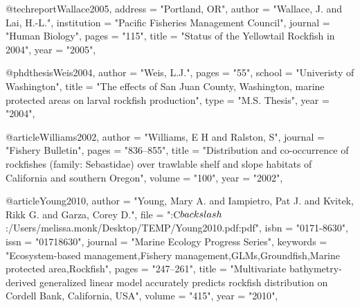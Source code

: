 @techreport{Wallace2005,
    address = "{Portland, OR}",
    author = "{Wallace, J. and Lai, H.-L.}",
    institution = "{Pacific Fisheries Management Council}",
    journal = "{Human Biology}",
    pages = "{115}",
    title = "{{Status of the Yellowtail Rockfish in 2004}}",
    year = "{2005}",
}

@phdthesis{Weis2004,
    author = "{Weis, L.J.}",
    pages = "{55}",
    school = "{Univeristy of Washington}",
    title = "{{The effects of San Juan County, Washington, marine protected areas on larval rockfish production}}",
    type = "{M.S. Thesis}",
    year = "{2004}",
}

@article{Williams2002,
    author = "{Williams, E H and Ralston, S}",
    journal = "{Fishery Bulletin}",
    pages = "{836--855}",
    title = "{{Distribution and co-occurrence of rockfishes (family: Sebastidae) over trawlable shelf and slope habitats of California and southern Oregon}}",
    volume = "{100}",
    year = "{2002}",
}

@article{Young2010,
    author = "{Young, Mary A. and Iampietro, Pat J. and Kvitek, Rikk G. and Garza, Corey D.}",
    file = "{:C$\\backslash$:/Users/melissa.monk/Desktop/TEMP/Young2010.pdf:pdf}",
    isbn = "{0171-8630}",
    issn = "{01718630}",
    journal = "{Marine Ecology Progress Series}",
    keywords = "{Ecosystem-based management,Fishery management,GLMs,Groundfish,Marine protected area,Rockfish}",
    pages = "{247--261}",
    title = "{{Multivariate bathymetry-derived generalized linear model accurately predicts rockfish distribution on Cordell Bank, California, USA}}",
    volume = "{415}",
    year = "{2010}",
}
